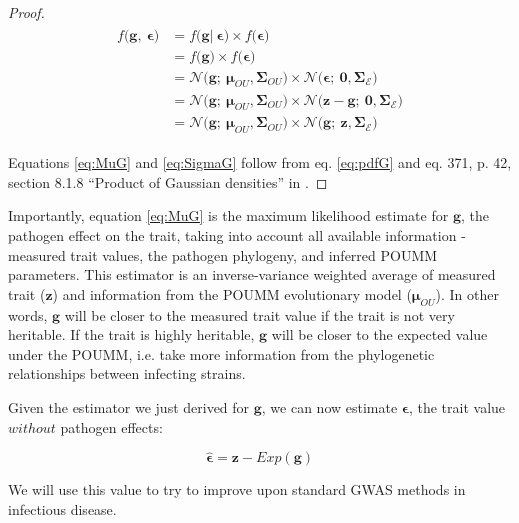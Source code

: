 \documentclass[11pt]{article}
\begin{document}
\begin{linenumbers}
\begin{proof}
	\begin{align}\label{eq:pdfG}
	\begin{split}
		f\big(\bm{g},\ \bm{\epsilon}\big) &= f\big(\bm{g}|\ \bm{\epsilon}\big) \times f\big(\bm{\epsilon}\big) \\
	&= f\big(\bm{g}\big) \times f\big(\bm{\epsilon}\big) \\
	&= \mathcal{N}\big(\bm{g};\ \bm{\mu}_{OU}, \mathbf{\Sigma}_{OU}\big) \times \mathcal{N}\big(\bm{\epsilon};\ \bm{0}, \mathbf{\Sigma}_\mathcal{E}\big) \\
	&= \mathcal{N}\big(\bm{g};\ \bm{\mu}_{OU}, \mathbf{\Sigma}_{OU}\big) \times \mathcal{N}\big(\bm{z} - \bm{g};\ \bm{0}, \mathbf{\Sigma}_\mathcal{E}\big) \\
	&= \mathcal{N}\big(\bm{g};\ \bm{\mu}_{OU}, \mathbf{\Sigma}_{OU}\big) \times \mathcal{N}\big(\bm{g};\ \bm{z}, \mathbf{\Sigma}_\mathcal{E}\big)
	\end{split}
\end{align}
	
	Equations \ref{eq:MuG} and \ref{eq:SigmaG} follow from eq. \ref{eq:pdfG} and eq. 371, p. 42, section 8.1.8 ``Product of Gaussian densities'' in \citet{Petersen2012}.
\end{proof}

Importantly, equation \ref{eq:MuG} is the maximum likelihood estimate for $\bm{g}$, the pathogen effect on the trait, taking into account all available information - measured trait values, the pathogen phylogeny, and inferred POUMM parameters. This estimator is an inverse-variance weighted average of measured trait ($\bm{z}$) and information from the POUMM evolutionary model ($\bm{\mu}_{OU}$). In other words, $\bm{g}$ will be closer to the measured trait value if the trait is not very heritable. If the trait is highly heritable, $\bm{g}$ will be closer to the expected value under the POUMM, i.e. take more information from the phylogenetic relationships between infecting strains. 

Given the estimator we just derived for $\bm{g}$, we can now estimate $\bm{\epsilon}$, the trait value $without$ pathogen effects: 

\begin{equation}
	\hat{\bm{\epsilon}} = \bm{z} - Exp(\bm{g})
	\label{eq:EHat}
\end{equation}

We will use this value to try to improve upon standard GWAS methods in infectious disease.


\end{linenumbers}
\end{document}
